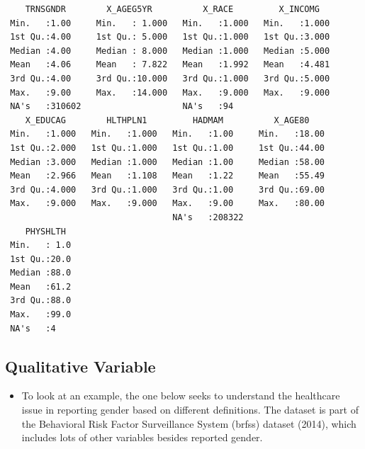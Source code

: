 \documentclass[
  letterpaper,
  DIV=11,
  numbers=noendperiod]{scrreprt}
\newenvironment{Shaded}{\begin{snugshade}}{\end{snugshade}}
\newcommand{\AttributeTok}[1]{\textcolor[rgb]{0.40,0.45,0.13}{#1}}
\newcommand{\CommentTok}[1]{\textcolor[rgb]{0.37,0.37,0.37}{#1}}
\newcommand{\FunctionTok}[1]{\textcolor[rgb]{0.28,0.35,0.67}{#1}}
\newcommand{\NormalTok}[1]{\textcolor[rgb]{0.00,0.23,0.31}{#1}}
\newcommand{\OtherTok}[1]{\textcolor[rgb]{0.00,0.23,0.31}{#1}}
\newcommand{\SpecialCharTok}[1]{\textcolor[rgb]{0.37,0.37,0.37}{#1}}
\newcommand{\StringTok}[1]{\textcolor[rgb]{0.13,0.47,0.30}{#1}}
\providecommand{\tightlist}{%
  \setlength{\itemsep}{0pt}\setlength{\parskip}{0pt}}\usepackage{longtable,booktabs,array}
\begin{document}
\begin{verbatim}
    TRNSGNDR        X_AGEG5YR          X_RACE         X_INCOMG    
 Min.   :1.00     Min.   : 1.000   Min.   :1.000   Min.   :1.000  
 1st Qu.:4.00     1st Qu.: 5.000   1st Qu.:1.000   1st Qu.:3.000  
 Median :4.00     Median : 8.000   Median :1.000   Median :5.000  
 Mean   :4.06     Mean   : 7.822   Mean   :1.992   Mean   :4.481  
 3rd Qu.:4.00     3rd Qu.:10.000   3rd Qu.:1.000   3rd Qu.:5.000  
 Max.   :9.00     Max.   :14.000   Max.   :9.000   Max.   :9.000  
 NA's   :310602                    NA's   :94                     
    X_EDUCAG        HLTHPLN1         HADMAM          X_AGE80     
 Min.   :1.000   Min.   :1.000   Min.   :1.00     Min.   :18.00  
 1st Qu.:2.000   1st Qu.:1.000   1st Qu.:1.00     1st Qu.:44.00  
 Median :3.000   Median :1.000   Median :1.00     Median :58.00  
 Mean   :2.966   Mean   :1.108   Mean   :1.22     Mean   :55.49  
 3rd Qu.:4.000   3rd Qu.:1.000   3rd Qu.:1.00     3rd Qu.:69.00  
 Max.   :9.000   Max.   :9.000   Max.   :9.00     Max.   :80.00  
                                 NA's   :208322                  
    PHYSHLTH   
 Min.   : 1.0  
 1st Qu.:20.0  
 Median :88.0  
 Mean   :61.2  
 3rd Qu.:88.0  
 Max.   :99.0  
 NA's   :4     
\end{verbatim}

\subsection{Qualitative Variable}\label{qualitative-variable}

\begin{itemize}
\tightlist
\item
  To look at an example, the one below seeks to understand the
  healthcare issue in reporting gender based on different definitions.
  The dataset is part of the Behavioral Risk Factor Surveillance System
  (brfss) dataset (2014), which includes lots of other variables besides
  reported gender.
\end{itemize}

\begin{Shaded}
\end{Shaded}
\end{document}
